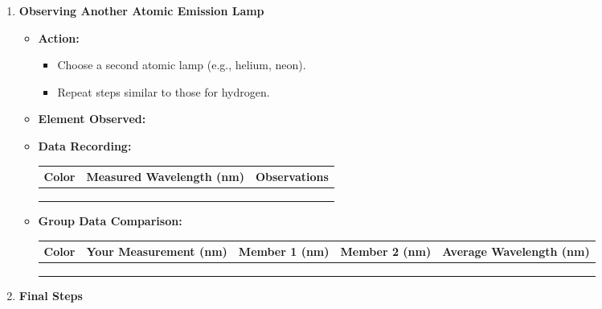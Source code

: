 \documentclass{article}
\begin{document}
\begin{enumerate}
    \item \textbf{Observing Another Atomic Emission Lamp}
    
    \begin{itemize}
        \item \textbf{Action:}
        \begin{itemize}
            \item Choose a second atomic lamp (e.g., helium, neon).
            \item Repeat steps similar to those for hydrogen.
        \end{itemize}
        \item \textbf{Element Observed:} \underline{\hspace{5cm}}
        \item \textbf{Data Recording:}
        
        \begin{center}
        \renewcommand{\arraystretch}{1.5}
        \begin{tabular}{|p{3cm}|p{4cm}|p{6cm}|}
        \hline
        \textbf{Color} & \textbf{Measured Wavelength (nm)} & \textbf{Observations} \\ \hline
        & & \\ \hline
        & & \\ \hline
        & & \\ \hline
        \end{tabular}
        \end{center}
        
        \item \textbf{Group Data Comparison:}
        
        \begin{center}
        \renewcommand{\arraystretch}{1.5}
        \begin{tabular}{|p{3cm}|p{3cm}|p{3cm}|p{3cm}|p{3cm}|}
        \hline
        \textbf{Color} & \textbf{Your Measurement (nm)} & \textbf{Member 1 (nm)} & \textbf{Member 2 (nm)} & \textbf{Average Wavelength (nm)} \\ \hline
        & & & & \\ \hline
        & & & & \\ \hline
        & & & & \\ \hline
        \end{tabular}
        \end{center}
    \end{itemize}
    
    \item \textbf{Final Steps}
    

\end{enumerate}
\end{document}
